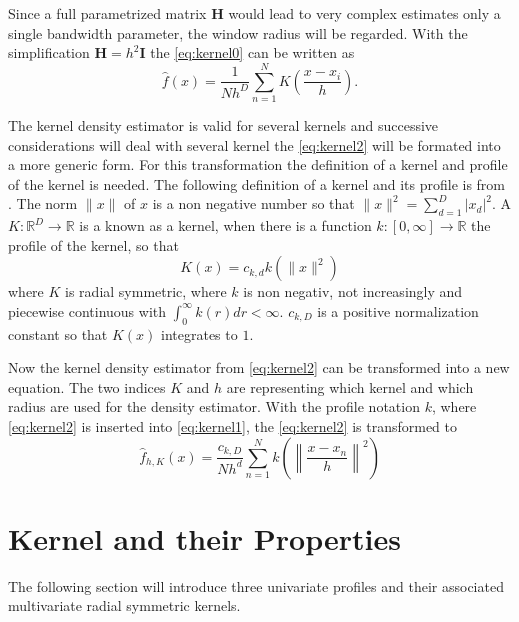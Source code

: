 Since a full parametrized matrix $\mathbf{H}$ would lead to very
complex estimates only a single bandwidth parameter, the window radius
will be regarded. With the simplification $\mathbf{H} = h^2
\mathbf{I}$ the \autoref{eq:kernel0} can be written as
\begin{equation}\label{eq:kernel2}
  \hat{f}(x) = \frac{1}{Nh^D}\sum_{n=1}^N K\left( \frac{x - x_i}{h} \right).
\end{equation}

The kernel density estimator is valid for several kernels and
successive considerations will deal with several kernel the
\autoref{eq:kernel2} will be formated into a more generic form. For
this transformation the definition of a kernel and profile of the
kernel is needed. The following definition of a kernel and its profile
is from \citeauthor{citeulike:2522867} \citep{citeulike:2522867}. The
norm $\lVert x \rVert$ of $x$ is a non negative number so that $\lVert
x \rVert^2 = \sum_{d = 1}^D|x_d|^2$.  A $K:\mathbb{R}^D \rightarrow
\mathbb{R}$ is a known as a kernel, when there is a function $k:[0,
\infty] \rightarrow \mathbb{R}$ the profile of the kernel, so that
\begin{equation}\label{eq:kernel3}
  K(x)=c_{k,d}k(\lVert x \rVert^2)
\end{equation}
where $K$ is radial symmetric, where $k$ is non negativ, not
increasingly and piecewise continuous with $\int_0^{\infty} k(r) dr <
\infty$. $c_{k,D}$ is a positive normalization constant so that $K(x)$
integrates to $1$.

Now the kernel density estimator from \autoref{eq:kernel2} can be
transformed into a new equation. The two indices $K$ and $h$ are
representing which kernel and which radius are used for the density
estimator. With the profile notation $k$, where \autoref{eq:kernel2}
is inserted into \autoref{eq:kernel1}, the \autoref{eq:kernel2} is
transformed to
\begin{equation}\label{eq:kernel4}
  \hat{f}_{h,K}(x) = \frac{c_{k,D}}{Nh^d}
  \sum_{n = 1}^N k\left(\left\lVert \frac{x-x_n}{h} \right\rVert^2\right)
\end{equation}



\section{Kernel and their Properties} %
\label{sec:kernel_properties}
The following section will introduce three univariate profiles and
their associated multivariate radial symmetric kernels.

